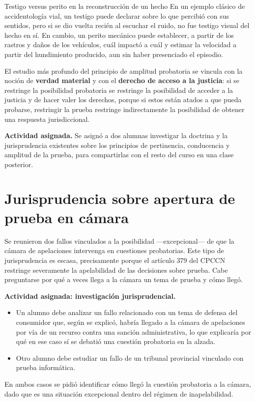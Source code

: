 \documentclass[12pt,oneside]{book}
\begin{document}
\begin{example}{Testigo versus perito en la reconstrucción de un hecho}
En un ejemplo clásico de accidentología vial, un testigo puede declarar sobre lo que percibió con sus sentidos, pero si se dio vuelta recién al escuchar el ruido, no fue testigo visual del hecho en sí. En cambio, un perito mecánico puede establecer, a partir de los rastros y daños de los vehículos, cuál impactó a cuál y estimar la velocidad a partir del hundimiento producido, aun sin haber presenciado el episodio.
\end{example}

El estudio más profundo del principio de amplitud probatoria se vincula con la noción de \textbf{verdad material} y con el \textbf{derecho de acceso a la justicia}: si se restringe la posibilidad probatoria se restringe la posibilidad de acceder a la justicia y de hacer valer los derechos, porque si estos están atados a que pueda probarse, restringir la prueba restringe indirectamente la posibilidad de obtener una respuesta jurisdiccional.

\begin{note}
\textbf{Actividad asignada.} Se asignó a dos alumnas investigar la doctrina y la jurisprudencia existentes sobre los principios de pertinencia, conducencia y amplitud de la prueba, para compartirlas con el resto del curso en una clase posterior.
\end{note}

\section{Jurisprudencia sobre apertura de prueba en cámara}

Se reunieron dos fallos vinculados a la posibilidad ---excepcional--- de que la cámara de apelaciones intervenga en cuestiones probatorias. Este tipo de jurisprudencia es escasa, precisamente porque el artículo 379 del CPCCN restringe severamente la apelabilidad de las decisiones sobre prueba. Cabe preguntarse por qué a veces llega a la cámara un tema de prueba y cómo llegó.

\begin{note}
\textbf{Actividad asignada: investigación jurisprudencial.}
\begin{itemize}
    \item Un alumno debe analizar un fallo relacionado con un tema de defensa del consumidor que, según se explicó, habría llegado a la cámara de apelaciones por vía de un recurso contra una sanción administrativa, lo que explicaría por qué en ese caso sí se debatió una cuestión probatoria en la alzada.
    \item Otro alumno debe estudiar un fallo de un tribunal provincial vinculado con prueba informática.
\end{itemize}
En ambos casos se pidió identificar cómo llegó la cuestión probatoria a la cámara, dado que es una situación excepcional dentro del régimen de inapelabilidad.
\end{note}
\end{document}
